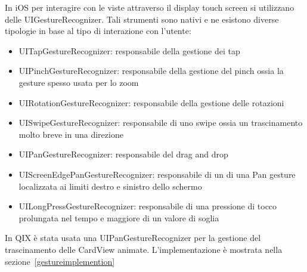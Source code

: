 In iOS per interagire con le viste attraverso il display touch screen si utilizzano delle UIGestureRecognizer.
Tali strumenti sono nativi e ne esistono diverse tipologie in base al tipo di interazione con l'utente:

\begin{itemize}
    \item UITapGestureRecognizer: responsabile della gestione dei tap

    \item UIPinchGestureRecognizer: responsabile della gestione del pinch ossia la gesture spesso usata per lo zoom
    
    \item UIRotationGestureRecognizer: responsabile della gestione delle rotazioni
    
    \item UISwipeGestureRecognizer: responsabile di uno swipe ossia un trascinamento molto breve in una direzione 
    
    \item UIPanGestureRecognizer: responsabile del drag and drop
    
    \item UIScreenEdgePanGestureRecognizer: responsabile di un di una Pan gesture localizzata ai limiti destro e sinistro dello schermo
    
    \item UILongPressGestureRecognizer: responsabile di una pressione di tocco prolungata nel tempo e maggiore di un valore di soglia
\end{itemize}

In QIX è stata usata una UIPanGestureRecognizer per la gestione del trascinamento delle CardView animate.
L'implementazione è mostrata nella sezione~\ref{gestureimplemention}
